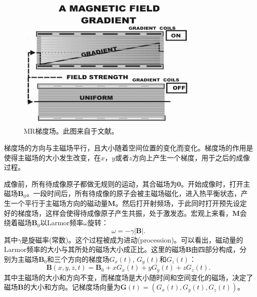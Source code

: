 \begin{figure}[htbp]
\centering
\includegraphics[width=0.8\textwidth]{img/intro/gradient.eps}
\caption{MR梯度场。此图来自于文献\cite{sprawls2000magnetic}。}
\label{fig:gradient}
\end{figure}
梯度场的方向与主磁场平行，且大小随着空间位置的变化而变化。梯度场的作用是使得主磁场的大小发生改变，在$x$，$y$或者$z$方向上产生一个梯度，用于之后的成像过程。

成像前，所有待成像原子都做无规则的运动，其合磁场为\textbf{0}。开始成像时，打开主磁场$\mathrm{\textbf{B}}_0$。一段时间后，所有待成像的原子会被主磁场磁化，进入热平衡状态，产生一个平行于主磁场方向的磁动量$\mathrm{\textbf{M}}$。然后打开射频场，于此同时打开预先设定好的梯度场，这样会使得待成像原子产生共振，处于激发态。宏观上来看，$\mathrm{\textbf{M}}$会绕着磁场$\mathrm{\textbf{B}}_0$以Larmor频率$\omega$旋转：
\begin{equation}
	\omega=-\gamma|\mathrm{\textbf{B}}|.
\end{equation}
其中$\gamma$是旋磁率(常数)。这个过程被成为进动(procession)。可以看出，磁动量的Larmor频率的大小与其所处的磁场大小成正比。这里的磁场$\mathrm{\textbf{B}}$由四部分构成，分别为主磁场$\mathrm{\textbf{B}}_0$和三个方向的梯度场$G_x(t)$, $G_y(t)$和$G_z(t)$：
\begin{equation}
	\mathrm{\textbf{B}}(x,y,z,t)=\mathrm{\textbf{B}}_0+x G_x(t)+y G_y(t)+z G_z(t).
\end{equation}
 其中主磁场的大小和方向不变，而梯度场是大小随时间和空间变化的磁场，决定了磁场$\mathrm{\textbf{B}}$的大小和方向。记梯度场向量为$\mathrm{\textbf{G}}(t)=(G_x(t),G_y(t),G_z(t))$。
 
